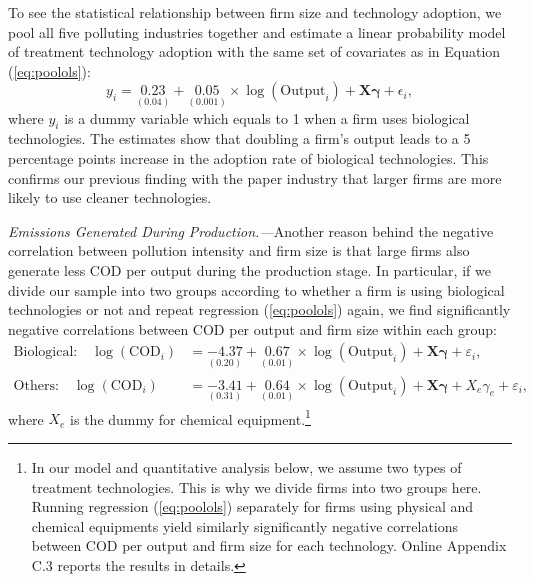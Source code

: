 \documentclass[AEJ]{AEA}
\renewcommand{\vec}[1]{\ensuremath{\mathbf{#1}}}
\begin{document}
To see the statistical relationship between firm size and technology adoption, we pool all five polluting industries together and estimate a linear probability model of treatment technology adoption with the same set of covariates as in Equation (\ref{eq:poolols}):
\begin{equation*}
    y_i = \underset{(0.04)}{0.23} + \underset{(0.001)}{0.05} \times \log (\text{Output}_i) + \vec{X} \vec{\gamma} + \epsilon_i,
\end{equation*}
where $y_i$ is a dummy variable which equals to 1 when a firm uses biological technologies. The estimates show that doubling a firm's output leads to a 5 percentage points increase in the adoption rate of biological technologies. This confirms our previous finding with the paper industry that larger firms are more likely to use cleaner technologies.

\textit{Emissions Generated During Production.---}Another reason behind the negative correlation between pollution intensity and firm size is that large firms also generate less COD per output during the production stage. In particular, if we divide our sample into two groups according to whether a firm is using biological technologies or not and repeat regression (\ref{eq:poolols}) again, we find significantly negative correlations between COD per output and firm size within each group:
\begin{align}
\label{eq:poolols_biological}
    \text{Biological:} \quad \log (\text{COD}_i) &= \underset{(0.20)}{-4.37} + \underset{(0.01)}{0.67} \times \log (\text{Output}_i) + \vec{X} \vec{\gamma} + \varepsilon_i, \\
\label{eq:poolols_others}
    \text{Others:} \quad \log (\text{COD}_i) &= \underset{(0.31)}{-3.41} + \underset{(0.01)}{0.64} \times \log (\text{Output}_i) + \vec{X} \vec{\gamma} + X_e \gamma_e + \varepsilon_i,
\end{align}
where $X_e$ is the dummy for chemical equipment.\footnote{In our model and quantitative analysis below, we assume two types of treatment technologies. This is why we divide firms into two groups here. Running regression (\ref{eq:poolols}) separately for firms using physical and chemical equipments yield similarly significantly negative correlations between COD per output and firm size for each technology. Online Appendix C.3 reports the results in details.}
\end{document}
